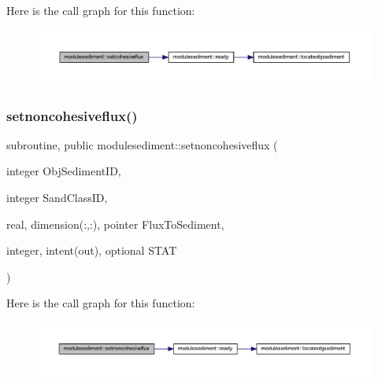 Here is the call graph for this function\+:\nopagebreak
\begin{figure}[H]
\begin{center}
\leavevmode
\includegraphics[width=350pt]{namespacemodulesediment_ab6753fbc97e7e46e60797defc442a36e_cgraph}
\end{center}
\end{figure}
\mbox{\label{namespacemodulesediment_ad60212253ba034e9fe1db4ab0c2c8442}} 
\subsubsection{\texorpdfstring{setnoncohesiveflux()}{setnoncohesiveflux()}}
{\footnotesize\ttfamily subroutine, public modulesediment\+::setnoncohesiveflux (\begin{DoxyParamCaption}\item[{integer}]{Obj\+Sediment\+ID,  }\item[{integer}]{Sand\+Class\+ID,  }\item[{real, dimension(\+:,\+:), pointer}]{Flux\+To\+Sediment,  }\item[{integer, intent(out), optional}]{S\+T\+AT }\end{DoxyParamCaption})}

Here is the call graph for this function\+:\nopagebreak
\begin{figure}[H]
\begin{center}
\leavevmode
\includegraphics[width=350pt]{namespacemodulesediment_ad60212253ba034e9fe1db4ab0c2c8442_cgraph}
\end{center}
\end{figure}
\mbox{\label{namespacemodulesediment_a8c48bc8f4d2f029c54181f59654feaa5}} 
